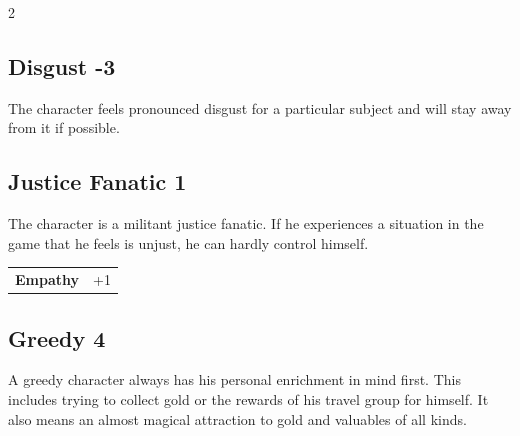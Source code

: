 \begin{multicols}{2}
\begin{tcolorbox}

\end{tcolorbox}

\begin{tcolorbox}
    \subsection*{Disgust \hfill \small{-3 }}
    \tcblower
The character feels pronounced disgust for a particular subject and will stay away from it if possible.


\vspace{3mm}



\end{tcolorbox}

\begin{tcolorbox}
    \subsection*{Justice Fanatic \hfill \small{1 }}
    \tcblower
The character is a militant justice fanatic. If he experiences a situation in the game that he feels is unjust, he can hardly control himself.


\vspace{3mm}

\begin{tabular}{@{}ll@{}}
    \textbf{Empathy} & +1\\
\end{tabular}


\end{tcolorbox}

\begin{tcolorbox}
    \subsection*{Greedy \hfill \small{4 }}
    \tcblower
A greedy character always has his personal enrichment in mind first. This includes trying to collect gold or the rewards of his travel group for himself. It also means an almost magical attraction to gold and valuables of all kinds.



\end{tcolorbox}
\end{multicols}
